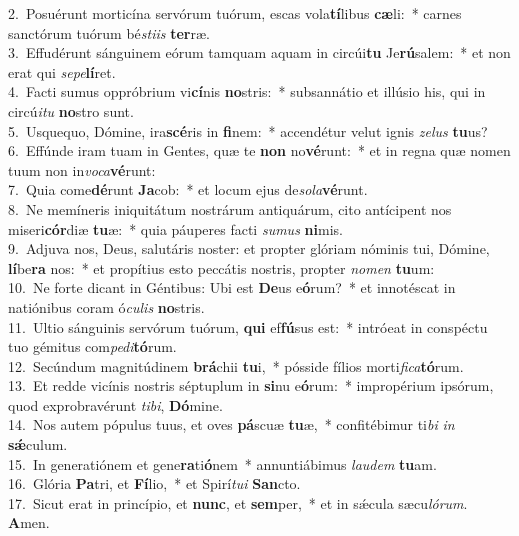 {2.~}Posuérunt morticína servórum tuórum, escas vola\textbf{tí}libus \textbf{cæ}li:~* carnes sanctórum tuórum bé\textit{sti}\textit{is} \textbf{ter}ræ.\\
{3.~}Effudérunt sánguinem eórum tamquam aquam in circúi\textbf{tu} Je\textbf{rú}salem:~* et non erat qui \textit{se}\textit{pe}\textbf{lí}ret.\\
{4.~}Facti sumus oppróbrium vi\textbf{cí}nis \textbf{no}stris:~* subsannátio et illúsio his, qui in circú\textit{i}\textit{tu} \textbf{no}stro sunt.\\
{5.~}Usquequo, Dómine, ira\textbf{scé}ris in \textbf{fi}nem:~* accendétur velut ignis \textit{ze}\textit{lus} \textbf{tu}us?\\
{6.~}Effúnde iram tuam in Gentes, quæ te \textbf{non} no\textbf{vé}runt:~* et in regna quæ nomen tuum non in\textit{vo}\textit{ca}\textbf{vé}runt:\\
{7.~}Quia come\textbf{dé}runt \textbf{Ja}cob:~* et locum ejus de\textit{so}\textit{la}\textbf{vé}runt.\\
{8.~}Ne memíneris iniquitátum nostrárum antiquárum, cito antícipent nos miseri\textbf{cór}diæ \textbf{tu}æ:~* quia páuperes facti \textit{su}\textit{mus} \textbf{ni}mis.\\
{9.~}Adjuva nos, Deus, salutáris noster: et propter glóriam nóminis tui, Dómine, \textbf{lí}be\textbf{ra} nos:~* et propítius esto peccátis nostris, propter \textit{no}\textit{men} \textbf{tu}um:\\
{10.~}Ne forte dicant in Géntibus: Ubi est \textbf{De}us e\textbf{ó}rum?~* et innotéscat in natiónibus coram ó\textit{cu}\textit{lis} \textbf{no}stris.\\
{11.~}Ultio sánguinis servórum tuórum, \textbf{qui} ef\textbf{fú}sus est:~* intróeat in conspéctu tuo gémitus com\textit{pe}\textit{di}\textbf{tó}rum.\\
{12.~}Secúndum magnitúdinem \textbf{brá}chii \textbf{tu}i,~* pósside fílios morti\textit{fi}\textit{ca}\textbf{tó}rum.\\
{13.~}Et redde vicínis nostris séptuplum in \textbf{si}nu e\textbf{ó}rum:~* impropérium ipsórum, quod exprobravérunt \textit{ti}\textit{bi}, \textbf{Dó}mine.\\
{14.~}Nos autem pópulus tuus, et oves \textbf{pá}scuæ \textbf{tu}æ,~* confitébimur ti\textit{bi} \textit{in} \textbf{sǽ}culum.\\
{15.~}In generatiónem et gene\textbf{ra}ti\textbf{ó}nem~* annuntiábimus \textit{lau}\textit{dem} \textbf{tu}am.\\
{16.~}Glória \textbf{Pa}tri, et \textbf{Fí}lio,~* et Spirí\textit{tu}\textit{i} \textbf{San}cto.\\
{17.~}Sicut erat in princípio, et \textbf{nunc}, et \textbf{sem}per,~* et in sǽcula sæcu\textit{ló}\textit{rum}. \textbf{A}men.\\
